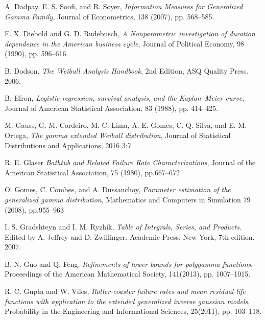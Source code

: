 \documentclass{ps}
\theoremstyle{plain}%
\theoremstyle{definition}
\theoremstyle{remark}
\begin{document}
\begin{thebibliography}{}
	
	A. Dadpay,  E. S. Soofi, and R. Soyer,  \emph{Information Measures for Generalized Gamma Family},  Journal of Econometrics, 138 (2007),  pp. 568--585.
	
	F. X. Diebold and G. D. Rudebusch,  \emph{A Nonparametric investigation of duration dependence in the American business cycle},  Journal of Political Economy, 98 (1990),  pp. 596--616.
	
	B. Dodson,  \emph{The Weibull Analysis Handbook}, 2nd Edition, ASQ Quality Press. 2006.
	
	B. Efron,  \emph{Logistic regression, survival analysis, and the Kaplan–Meier curve}, Journal of American Statistical Association, 83 (1988),  pp. 414--425.
	
	M. Gauss, G. M. Cordeiro,  M. C. Lima,   A. E. Gomes, C. Q. Silva, and E. M. Ortega,  \emph{The gamma extended Weibull distribution}, Journal of Statistical Distributions and Applications, 2016 3:7
	
	
	R. E. Glaser  \emph{Bathtub and Related Failure Rate Characterizations}, Journal of the American Statistical Association, 75 (1980),  pp.667--672
	
	O. Gomes, C. Combes, and A. Dussauchoy,  \emph{Parameter estimation of the generalized gamma distribution}, Mathematics and Computers in Simulation 79 (2008),  pp.955--963
	
	I. S. Gradshteyn and I. M. Ryzhik,  \emph{Table of Integrals, Series, and Products}. Edited by A. Jeffrey and D. Zwillinger. Academic Press, New York, 7th edition, 2007.
	
	B.-N. Guo and  Q. Feng, \emph{ Refinements of lower bounds for polygamma functions}, Proceedings of the American Mathematical Society, 141(2013),  pp. 1007--1015.
	
	R. C. Gupta and  W. Viles, \emph{ Roller-coaster failure rates and mean residual life functions with application to the extended generalized inverse gaussian models}, Probability in the Engineering and Informational Sciences, 25(2011),  pp. 103--118.
	

\end{thebibliography}
\end{document}
